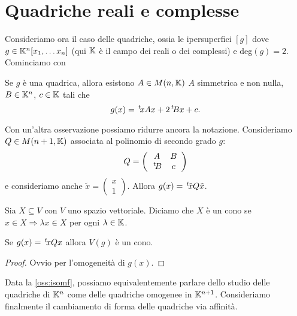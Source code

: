 \documentclass[a4paper,12pt]{article}
\begin{document}
\section{Quadriche reali e complesse}

Consideriamo ora il caso delle quadriche, ossia le ipersuperfici $[g]$ dove $g\in \mathbb K^n[x_1,\dots x_n]$
(qui $\mathbb K$ è il campo dei reali o dei complessi) e deg$(g)=2$. Cominciamo con
\begin{remark}
	Se $g$ è una quadrica, allora esistono $A\in M(n,\mathbb K)$ $A$ simmetrica e non nulla, $B\in \mathbb K^n$, $c\in \mathbb K$ tali che
	\[
		g(x) = \, ^{t}\!xAx+2\, ^{t}\!Bx+c.
	\]
\end{remark}

\begin{remark}\label{oss:isomf}
	Con un'altra osservazione possiamo ridurre ancora la notazione. Consideriamo $Q\in M(n+1,\mathbb K)$ associata al polinomio di secondo grado $g$:
	\[
		Q=\left(
			\begin{array}{cc}
			A & B\\
			\, ^{t}\!B & c
			\end{array}
		\right)
	\]
	e consideriamo anche $\tilde{x} =\left(\begin{smallmatrix}
x \\
1
\end{smallmatrix}
\right)$. Allora $g(x)=\, ^{t}\!\tilde{x}Q\tilde{x}$.
\end{remark}

\begin{definition}[Cono]
	Sia $X\subseteq V$ con $V$ uno spazio vettoriale. Diciamo che $X$ è un cono se $x\in X\Rightarrow \lambda x\in X$ per ogni $\lambda \in \mathbb K$.
\end{definition}
\begin{lemma}
	Se $g(x)=\, ^{t}\!xQx$ allora $V(g)$ è un cono.
\end{lemma}
\begin{proof}
	Ovvio per l'omogeneità di $g(x)$.
\end{proof}

Data la \cref{oss:isomf}, possiamo equivalentemente parlare dello studio delle quadriche di $\mathbb K^n$ come delle quadriche omogenee in $\mathbb K^{n+1}$.
Consideriamo finalmente il cambiamento di forma delle  quadriche via affinità.
\end{document}
